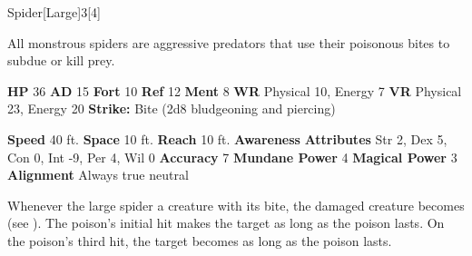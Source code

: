   \begin{monsection}{Spider}[Large]{3}[4]
    \vspace{-1em}\vspace{-1em}
    \vspace{0em}

    
    All monstrous spiders are aggressive predators that use their poisonous bites to subdue or kill prey.
  
    

    \begin{spellcontent}
      \begin{spelltargetinginfo}
        \pari \textbf{HP} 36 \monsep
          \textbf{AD} 15 \monsep
          \textbf{Fort} 10 \monsep
          \textbf{Ref} 12 \monsep
          \textbf{Ment} 8
        \pari \textbf{WR} Physical 10, Energy 7 \monsep
        \textbf{VR} Physical 23, Energy 20
        \pari \textbf{Strike:}
            Bite  (2d8 bludgeoning and piercing)
      \end{spelltargetinginfo}
    \end{spellcontent}
    \begin{monsterfooter}
      \pari \textbf{Speed} 40 ft. \monsep
        \textbf{Space} 10 ft. \monsep
        \textbf{Reach} 10 ft.
      \pari \textbf{Awareness} 
      \pari \textbf{Attributes}
        Str 2, Dex 5,
        Con 0, Int -9,
        Per 4, Wil 0
      \pari \textbf{Accuracy} 7 \monsep
        \textbf{Mundane Power} 4 \monsep
      \textbf{Magical Power} 3
      \pari \textbf{Alignment} Always true neutral
    \end{monsterfooter}
  \end{monsection}
        Whenever the large spider  a creature with its bite,
          the damaged creature becomes  (see ).
        The poison's initial hit makes the target  as long as the poison lasts.
        On the poison's third hit, the target becomes  as long as the poison lasts.
  
